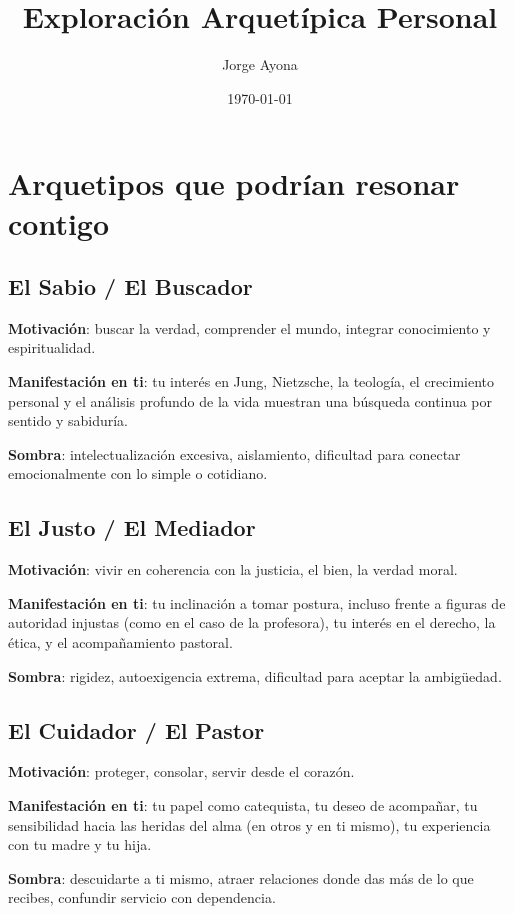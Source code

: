 \documentclass[12pt]{article}
\title{Exploración Arquetípica Personal}
\author{Jorge Ayona}
\date{\today}
\begin{document}
\maketitle

\section*{Arquetipos que podrían resonar contigo}

\subsection*{ El Sabio / El Buscador}
\textbf{Motivación}: buscar la verdad, comprender el mundo, integrar conocimiento y espiritualidad.

\textbf{Manifestación en ti}: tu interés en Jung, Nietzsche, la teología, el crecimiento personal y el análisis profundo de la vida muestran una búsqueda continua por sentido y sabiduría.

\textbf{Sombra}: intelectualización excesiva, aislamiento, dificultad para conectar emocionalmente con lo simple o cotidiano.

\subsection*{ El Justo / El Mediador}
\textbf{Motivación}: vivir en coherencia con la justicia, el bien, la verdad moral.

\textbf{Manifestación en ti}: tu inclinación a tomar postura, incluso frente a figuras de autoridad injustas (como en el caso de la profesora), tu interés en el derecho, la ética, y el acompañamiento pastoral.

\textbf{Sombra}: rigidez, autoexigencia extrema, dificultad para aceptar la ambigüedad.

\subsection*{ El Cuidador / El Pastor}
\textbf{Motivación}: proteger, consolar, servir desde el corazón.

\textbf{Manifestación en ti}: tu papel como catequista, tu deseo de acompañar, tu sensibilidad hacia las heridas del alma (en otros y en ti mismo), tu experiencia con tu madre y tu hija.

\textbf{Sombra}: descuidarte a ti mismo, atraer relaciones donde das más de lo que recibes, confundir servicio con dependencia.
\end{document}
